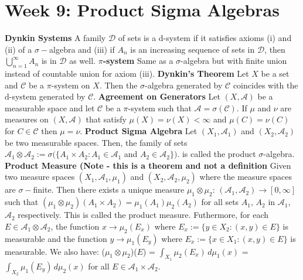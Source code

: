 \documentclass{article}
\begin{document}
\section{Week 9: Product Sigma Algebras}
\textbf{Dynkin Systems} A family $\mathcal{D}$ of sets is a d-system if it satisfies axioms (i) and (ii) of a $\sigma-$algebra and (iii) if $A_n$ is an increasing sequence of sets in $\mathcal{D}$, then $\bigcup\limits_{n=1}^{\infty} A_n$ is in $\mathcal{D}$ as well.
\newline \newline \textbf{$\pi$-system} Same as a $\sigma$-algebra but with finite union instead of countable union for axiom (iii).
\newline \newline \textbf{Dynkin's Theorem} Let $X$ be a set and $\mathcal{C}$ be a $\pi$-system on $X$. Then the $\sigma$-algebra generated by $\mathcal{C}$ coincides with the d-system generated by $\mathcal{C}$.
\newline \newline \textbf{Agreement on Generators} Let $(X, \mathcal{A})$ be a measurable space and let $\mathcal{C}$ be a $\pi$-system such that $\mathcal{A} = \sigma(\mathcal{C})$. If $\mu$ and $\nu$ are measures on $(X, \mathcal{A})$ that satisfy $\mu(X) = \nu(X) < \infty$ and $\mu(C) = \nu(C)$ for $C \in \mathcal{C}$ then $\mu = \nu$.
\newline \newline \textbf{Product Sigma Algebra} Let $(X_1,\mathcal{A}_1)$ and $(X_2,\mathcal{A}_2)$ be two measurable spaces. Then, the family of sets $\mathcal{A}_1 \otimes \mathcal{A}_2 := \sigma(\{A_1 \times A_2: A_1 \in \mathcal{A}_1$ and $A_2 \in \mathcal{A}_2 \})$. is called the product $\sigma$-algebra.
\newline \newline \textbf{Product Measure (Note - this is a theorem and not a definition} Given two measure spaces $(X_1,\mathcal{A}_1, \mu_1)$ and $(X_2,\mathcal{A}_2, \mu_2)$ where the measure spaces are $\sigma-$finite. Then there exists a unique measure $\mu_1 \otimes \mu_2$: $(\mathcal{A}_1, \mathcal{A}_2) \rightarrow [0, \infty]$ such that $(\mu_1 \otimes \mu_2)(A_1 \times A_2) = \mu_1(A_1)\mu_2(A_2)$ for all sets $A_1$, $A_2$ in $\mathcal{A_1}$, $\mathcal{A_2}$ respectively. This is called the product measure.
\newline \newline Futhermore, for each $E \in \mathcal{A}_1 \otimes \mathcal{A}_2$, the function $x \rightarrow \mu_2(E_x)$ where $E_x := \{ y \in X_2 : (x,y) \in E \}$ is measurable
\newline and the function $y \rightarrow \mu_1(E_y)$ where $E_x := \{ x \in X_1 : (x,y) \in E \}$ is measurable.
\newline We also have: ($\mu_1 \otimes \mu_2$)($E$) = $\int_{X_1} \mu_2(E_x) \,d\mu_1(x)$ = $\int_{X_2} \mu_1(E_y) \,d\mu_2(x)$ for all $E \in \mathcal{A}_1 \times \mathcal{A}_2$.
\end{document}
